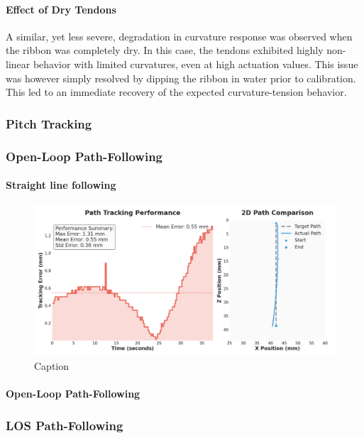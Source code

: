 \paragraph*{Effect of Dry Tendons}
A similar, yet less severe, degradation in curvature response was observed when the ribbon was completely dry. In this case, the tendons exhibited highly non-linear behavior with limited curvatures, even at high actuation values. This issue was however simply resolved by dipping the ribbon in water prior to calibration. This led to an immediate recovery of the expected curvature-tension behavior.



\subsubsection{Pitch Tracking}

\subsubsection{Open-Loop Path-Following}

\paragraph*{Straight line following}
\begin{figure} [H]
    \centering
    \includegraphics[width=\linewidth]{images/pathfollowing/openloop/straight_20250704_172708_3.png}
    \caption{Caption}
    \label{fig:enter-label}
\end{figure}

\paragraph*{Open-Loop Path-Following}

\subsubsection{LOS Path-Following}

